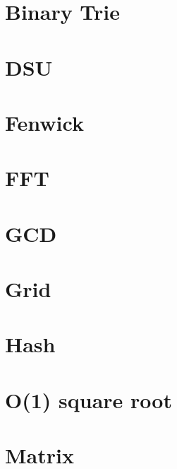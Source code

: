 \documentclass{article}
\begin{document}
\tableofcontents


%

\section{Binary Trie}


\section{DSU}


%

\section{Fenwick}


\section{FFT}


\section{GCD}


\section{Grid}


\section{Hash}


\section{O(1) square root}


\section{Matrix}

\end{document}
